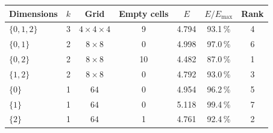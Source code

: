 \begin{tabular}{lcccccc}
\toprule
Dimensions & $k$ & Grid & Empty cells & $E$ & $E/E_{\max}$ & Rank \\
\midrule
$\{0,1,2\}$ & 3 & $4\times4\times4$ & 9 & 4.794 & 93.1\,\% & 4 \\
\midrule
$\{0,1\}$ & 2 & $8\times8$ & 0 & 4.998 & 97.0\,\% & 6 \\
$\{0,2\}$ & 2 & $8\times8$ & 10 & 4.482 & 87.0\,\% & 1 \\
$\{1,2\}$ & 2 & $8\times8$ & 0 & 4.792 & 93.0\,\% & 3 \\
\midrule
$\{0\}$ & 1 & $64$ & 0 & 4.954 & 96.2\,\% & 5 \\
$\{1\}$ & 1 & $64$ & 0 & 5.118 & 99.4\,\% & 7 \\
$\{2\}$ & 1 & $64$ & 1 & 4.761 & 92.4\,\% & 2 \\
\bottomrule
\end{tabular}
